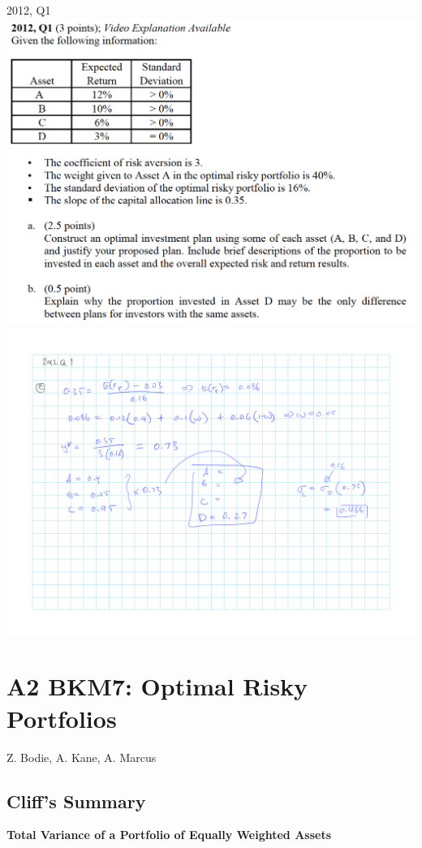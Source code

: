 \documentclass[]{book}
\theoremstyle{definition}
\theoremstyle{definition}
\theoremstyle{remark}
\begin{document}
 2012, Q1 \includegraphics{questions/2012-1Q.png}
\includegraphics{questions/2012-1A.png}

\chapter{A2 BKM7: Optimal Risky
Portfolios}\label{a2-bkm7-optimal-risky-portfolios}

Z. Bodie, A. Kane, A. Marcus

\section{Cliff's Summary}\label{cliffs-summary-1}

\textbf{Total Variance of a Portfolio of Equally Weighted Assets}
\end{document}
